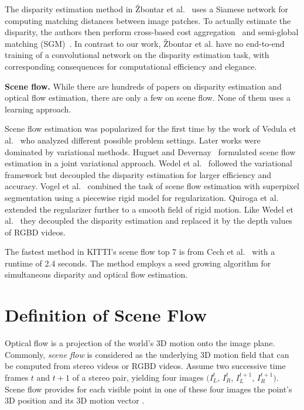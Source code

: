 \documentclass[10pt,twocolumn,letterpaper]{article}
\begin{document}
The disparity estimation method in {\v{Z}}bontar et al.~\cite{zbontar2015stereo} uses a Siamese network for computing matching distances between image patches. To actually estimate the disparity, the authors then perform cross-based cost aggregation~\cite{ZhangLL09} and semi-global matching (SGM)~\cite{Hirschmueller2008PAMI}. In contrast to our work, {\v{Z}}bontar et al. have no end-to-end training of a convolutional network on the disparity estimation task, with corresponding consequences for computational efficiency and elegance. 


\textbf{Scene flow.}
While there are hundreds of papers on disparity estimation and optical flow estimation, there are only a few on scene flow. None of them uses a learning approach. 

Scene flow estimation was popularized for the first time by the work of Vedula et al.~\cite{VBRCK05} who analyzed different possible problem settings. Later works were dominated by variational methods. Huguet and Devernay~\cite{HD07} formulated scene flow estimation in a joint variational approach. Wedel et al.~\cite{wedel2008efficient} followed the variational framework but decoupled the disparity estimation for larger efficiency and accuracy. Vogel et al.~\cite{Vogel2013ICCV} combined the task of scene flow estimation with superpixel segmentation using a piecewise rigid model for regularization.
Quiroga et al.~\cite{quiroga2012scene} extended the regularizer further to a smooth field of rigid motion. Like Wedel et al.~\cite{wedel2008efficient} they decoupled the disparity estimation and replaced it by the depth values of RGBD videos. 

The fastest method in KITTI's scene flow top 7 is from Cech et al.~\cite{Cech11} with a runtime of 2.4 seconds. 
The method employs a seed growing algorithm for simultaneous disparity and optical flow estimation.


\section{Definition of Scene Flow}\label{sec:def_sf}

Optical flow is a projection of the world's 3D motion onto the image plane.
Commonly, \emph{scene flow} is considered as the underlying 3D motion field that can be computed from stereo videos or RGBD videos. Assume two successive time frames $t$ and $t\!+\!1$ of a stereo pair, yielding four images $(I^{t}_L$, $I^{t}_R$, $I^{t+1}_L$, $I^{t+1}_R)$. Scene flow provides for each visible point in one of these four images the point's 3D position and its 3D motion vector \cite{VedulaSF99}.
\end{document}
